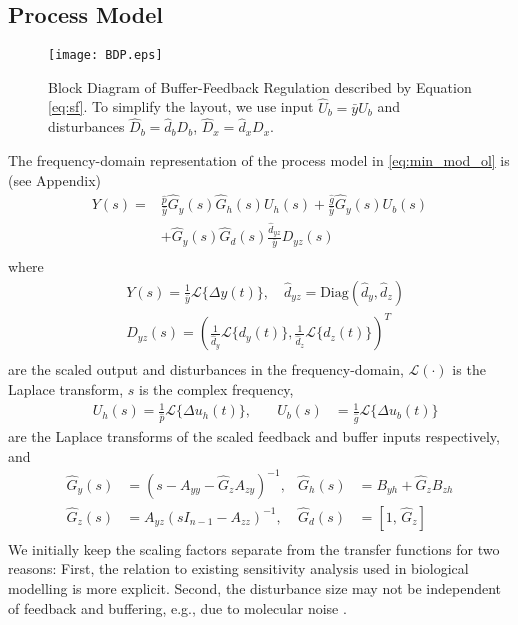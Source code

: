 \documentclass[letterpaper, 10 pt,  conference]{ieeeconf}  %
\begin{document}
\subsection{Process Model}

\begin{figure}
\centering
    \texttt{[image: BDP.eps]}
\caption{Block Diagram of Buffer-Feedback Regulation described by Equation \eqref{eq:sf}. To simplify the layout, we use input $\hat{U}_b=\bar{y}U_b$ and disturbances $\hat{D}_b=\hat{d}_bD_b$, $\hat{D}_x=\hat{d}_xD_x$.}
\label{fig:BDPB}
\end{figure}

The frequency-domain representation of the process model in
\eqref{eq:min_mod_ol} is (see Appendix)
\begin{equation}\label{eq:ol_tf}
\begin{aligned}
Y(s)=&\frac{\hat{p}}{\bar{y}}\hat G_y(s)\hat G_h(s)U_h(s)+\frac{\hat{g}}{\bar{y}}\hat G_y(s)U_b(s)\\
&+\hat G_y(s)\hat G_d(s)\frac{\hat d_{yz}}{\bar{y}}D_{yz}(s)\\
\end{aligned}
\end{equation}
where 
\begin{equation*}
\begin{aligned}
&Y(s)=\frac{1}{\bar{y}}{\mathcal{L}\{\Delta y(t)\}},\quad \hat d_{yz}=\text{Diag}({\hat{d}_y,\hat{d}_z})\\
& D_{yz}(s)=\left(\frac{1}{\hat d_y}\mathcal{L}\{d_y(t)\}, \frac{1}{\hat d_z}\mathcal{L}\{d_z(t)\}\right)^T\\
\end{aligned}
\end{equation*}
are the scaled output and disturbances in the frequency-domain, $\mathcal{L}(\cdot)$ is the Laplace transform,  $s$ is the complex frequency,  
\begin{equation*}
\begin{aligned}
&U_h(s)=\frac{1}{\hat{p}}\mathcal{L}\{\Delta u_h(t)\},\quad &U_b(s)&=\frac{1}{\hat{g}}\mathcal{L}\{\Delta u_b(t)\}
\end{aligned}
\end{equation*}
are the Laplace transforms of the scaled feedback and buffer inputs respectively, and
\begin{equation*}
\begin{aligned}
\hat G_y (s)&=(s-A_{yy}-\hat G_zA_{zy})^{-1},&\hat G_h(s)&=B_{yh}+\hat G_zB_{zh}\\
\hat G_z (s)&= A_{yz}(sI_{n-1}-A_{zz})^{-1},&\hat G_d(s)&=[1,\, \hat G_z]\\
\end{aligned}
\end{equation*}
We initially keep the scaling factors separate from the transfer functions for two reasons: First, the relation to existing sensitivity analysis used in biological modelling \cite{KLIEA09} is more explicit. Second, the disturbance size may not be independent of feedback and buffering, e.g., due to molecular noise \cite{HANAPS17}.
\end{document}
